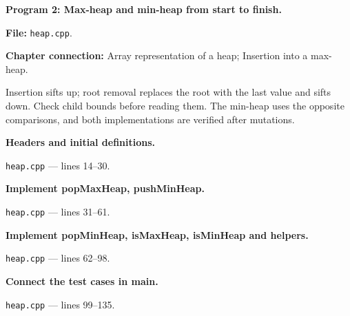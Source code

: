 \textbf{Program 2: Max-heap and min-heap from start to finish.}

\textbf{File:} \texttt{heap.cpp}.

\textbf{Chapter connection:} Array representation of a heap; Insertion into a max-heap.

Insertion sifts up; root removal replaces the root with the last value and sifts down. Check child bounds before reading them. The min-heap uses the opposite comparisons, and both implementations are verified after mutations.



\begin{utpsteps}\setcounter{enumi}{0}\item \textbf{Headers and initial definitions.}\end{utpsteps}

\texttt{heap.cpp} --- lines 14--30.




\tcbbreak

\begin{utpsteps}\setcounter{enumi}{1}\item \textbf{Implement popMaxHeap, pushMinHeap.}\end{utpsteps}

\texttt{heap.cpp} --- lines 31--61.






\tcbbreak

\begin{utpsteps}\setcounter{enumi}{2}\item \textbf{Implement popMinHeap, isMaxHeap, isMinHeap and helpers.}\end{utpsteps}

\texttt{heap.cpp} --- lines 62--98.




\tcbbreak

\begin{utpsteps}\setcounter{enumi}{3}\item \textbf{Connect the test cases in main.}\end{utpsteps}

\texttt{heap.cpp} --- lines 99--135.

